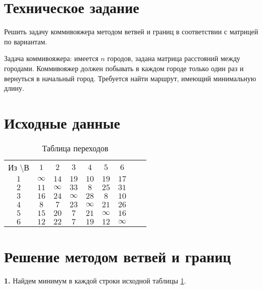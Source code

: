 





\tableofcontents
\listoffigures
\newpage

\section{Техническое задание}

Решить задачу коммивояжера методом ветвей и границ в соответствии с матрицей по вариантам.  

Задача коммивояжера: имеется $n$ городов, задана матрица расстояний между городами. Коммивояжер должен побывать в каждом городе только один раз и вернуться в начальный город. Требуется найти маршрут, имеющий минимальную длину.

\section{Исходные данные}

\begin{table}[H]
\begin{center}
	\def\tabcolsep{15pt}
	\caption{Таблица переходов}
	\label{tab:1}
	\begin{tabular}{|c||c|c|c|c|c|c|c|c|}
		\hline
		Из \textbackslash В & $1$ & $2$ & $3$ & $4$ & $5$ & $6$ \\
		\hhline{|=#=|=|=|=|=|=|}
		$1$ & $\infty$ & $14$ & $19$ & $10$ & $19$ & $17$ \\
		\hline
		$2$ & $11$ & $\infty$ & $33$ & $8$ & $25$ & $31$ \\
		\hline
		$3$ & $16$ & $24$ & $\infty$ & $28$ & $8$ & $10$ \\ 
		\hline
		$4$ & $8$ & $7$ & $23$ & $\infty$ & $21$ & $26$ \\
		\hline
		$5$ & $15$ & $20$ & $7$ & $21$ & $\infty$ & $16$ \\
		\hline
		$6$ & $12$ & $22$ & $7$ & $19$ & $12$ & $\infty$ \\ 
		\hline
	\end{tabular}
\end{center}
\end{table} 

\section{Решение методом ветвей и границ}

\textbf{1.} Найдем минимум в каждой строки исходной таблицы \ref{tab:1}.

